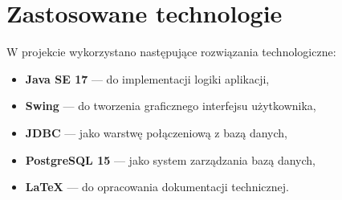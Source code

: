 \section{Zastosowane technologie}

W projekcie wykorzystano następujące rozwiązania technologiczne:
\begin{itemize}
    \item \textbf{Java SE 17} — do implementacji logiki aplikacji,
    \item \textbf{Swing} — do tworzenia graficznego interfejsu użytkownika,
    \item \textbf{JDBC} — jako warstwę połączeniową z bazą danych,
    \item \textbf{PostgreSQL 15} — jako system zarządzania bazą danych,
    \item \textbf{\LaTeX} — do opracowania dokumentacji technicznej.
\end{itemize}
